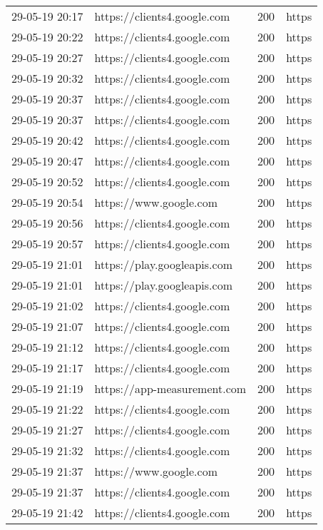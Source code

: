 \begin{longtable}[c]{@{}llll@{}}
    29-05-19 20:17 & https://clients4.google.com & 200 & https \\
    29-05-19 20:22 & https://clients4.google.com & 200 & https \\
    29-05-19 20:27 & https://clients4.google.com & 200 & https \\
    29-05-19 20:32 & https://clients4.google.com & 200 & https \\
    29-05-19 20:37 & https://clients4.google.com & 200 & https \\
    29-05-19 20:37 & https://clients4.google.com & 200 & https \\
    29-05-19 20:42 & https://clients4.google.com & 200 & https \\
    29-05-19 20:47 & https://clients4.google.com & 200 & https \\
    29-05-19 20:52 & https://clients4.google.com & 200 & https \\
    29-05-19 20:54 & https://www.google.com & 200 & https \\
    29-05-19 20:56 & https://clients4.google.com & 200 & https \\
    29-05-19 20:57 & https://clients4.google.com & 200 & https \\
    29-05-19 21:01 & https://play.googleapis.com & 200 & https \\
    29-05-19 21:01 & https://play.googleapis.com & 200 & https \\
    29-05-19 21:02 & https://clients4.google.com & 200 & https \\
    29-05-19 21:07 & https://clients4.google.com & 200 & https \\
    29-05-19 21:12 & https://clients4.google.com & 200 & https \\
    29-05-19 21:17 & https://clients4.google.com & 200 & https \\
    29-05-19 21:19 & https://app-measurement.com & 200 & https \\
    29-05-19 21:22 & https://clients4.google.com & 200 & https \\
    29-05-19 21:27 & https://clients4.google.com & 200 & https \\
    29-05-19 21:32 & https://clients4.google.com & 200 & https \\
    29-05-19 21:37 & https://www.google.com & 200 & https \\
    29-05-19 21:37 & https://clients4.google.com & 200 & https \\
    29-05-19 21:42 & https://clients4.google.com & 200 & https \\

\end{longtable}
